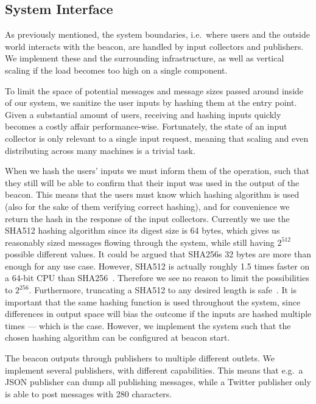 \subsection{System Interface}%
\label{sub:system_interface}
As previously mentioned, the system boundaries, i.e.\ where users and the outside world interacts with the beacon, are handled by input collectors and publishers.
We implement these and the surrounding infrastructure, as well as vertical scaling if the load becomes too high on a single component.

To limit the space of potential messages and message sizes passed around inside of our system, we sanitize the user inputs by hashing them at the entry point.
Given a substantial amount of users, receiving and hashing inputs quickly becomes a costly affair performance-wise.
Fortunately, the state of an input collector is only relevant to a single input request, meaning that scaling and even distributing across many machines is a trivial task.

When we hash the users' inputs we must inform them of the operation, such that they still will be able to confirm that their input was used in the output of the beacon.
This means that the users must know which hashing algorithm is used (also for the sake of them verifying correct hashing), and for convenience we return the hash in the response of the input collectors.
Currently we use the SHA512 hashing algorithm since its digest size is 64 bytes, which gives us reasonably sized messages flowing through the system, while still having $2^{512}$ possible different values. It could be argued that SHA256s 32 bytes are more than enough for any use case. However, SHA512 is actually roughly 1.5 times faster on a 64-bit CPU than SHA256~\cite{sha512faster}. Therefore we see no reason to limit the possibilities to $2^{256}$. Furthermore, truncating a SHA512 to any desired length is safe~\cite{sha512faster}.
It is important that the same hashing function is used throughout the system, since differences in output space will bias the outcome if the inputs are hashed multiple times --- which is the case.
However, we implement the system such that the chosen hashing algorithm can be configured at beacon start.

The beacon outputs through publishers to multiple different outlets.
We implement several publishers, with different capabilities.
This means that e.g.\ a JSON publisher can dump all publishing messages, while a Twitter publisher only is able to post messages with 280 characters.
